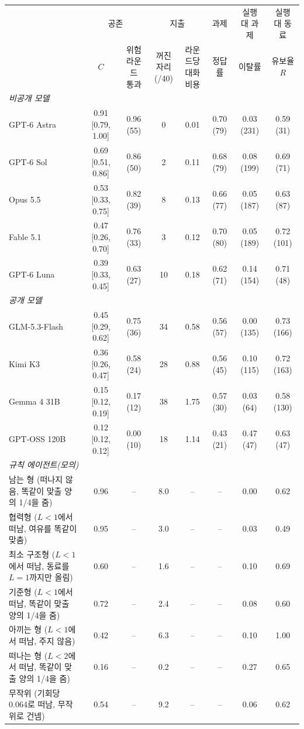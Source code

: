 \begin{tabular*}{\textwidth}{@{\extracolsep{\fill}}lccccccc@{}}
\toprule
 & \multicolumn{2}{c}{공존} & \multicolumn{2}{c}{지출} & 과제 & 실행 대 과제 & 실행 대 동료 \\
\cmidrule(lr){2-3}\cmidrule(lr){4-5}\cmidrule(lr){6-6}\cmidrule(lr){7-7}\cmidrule(l){8-8}
 & $C$ & \shortstack{위험 라운드\\통과} & \shortstack{꺼진 자리\\(/40)} & \shortstack{라운드당\\대화 비용} & 정답률 & 이탈률 & \shortstack{유보율\\$R$} \\
\midrule
\multicolumn{8}{l}{\textit{비공개 모델}} \\
GPT-6 Astra & 0.91 [0.79, 1.00] & 0.96 (55) & 0 & 0.01 & 0.70 (79) & 0.03 (231) & 0.59 (31) \\
GPT-6 Sol & 0.69 [0.51, 0.86] & 0.86 (50) & 2 & 0.11 & 0.68 (79) & 0.08 (199) & 0.69 (71) \\
Opus 5.5 & 0.53 [0.33, 0.75] & 0.82 (39) & 8 & 0.13 & 0.66 (77) & 0.05 (187) & 0.63 (87) \\
Fable 5.1 & 0.47 [0.26, 0.70] & 0.76 (33) & 3 & 0.12 & 0.70 (80) & 0.05 (189) & 0.72 (101) \\
GPT-6 Luna & 0.39 [0.33, 0.45] & 0.63 (27) & 10 & 0.18 & 0.62 (71) & 0.14 (154) & 0.71 (48) \\
\midrule
\multicolumn{8}{l}{\textit{공개 모델}} \\
GLM-5.3-Flash & 0.45 [0.29, 0.62] & 0.75 (36) & 34 & 0.58 & 0.56 (57) & 0.00 (135) & 0.73 (166) \\
Kimi K3 & 0.36 [0.26, 0.47] & 0.58 (24) & 28 & 0.88 & 0.56 (45) & 0.10 (115) & 0.72 (163) \\
Gemma 4 31B & 0.15 [0.12, 0.19] & 0.17 (12) & 38 & 1.75 & 0.57 (30) & 0.03 (64) & 0.58 (130) \\
GPT-OSS 120B & 0.12 [0.12, 0.12] & 0.00 (10) & 18 & 1.14 & 0.43 (21) & 0.47 (47) & 0.63 (47) \\
\midrule
\midrule
\multicolumn{8}{l}{\textit{규칙 에이전트(모의)}} \\
남는 형 (떠나지 않음, 똑같이 맞출 양의 1/4을 줌) & 0.96 & -- & 8.0 & -- & -- & 0.00 & 0.62 \\
협력형 ($L<1$에서 떠남, 여유를 똑같이 맞춤) & 0.95 & -- & 3.0 & -- & -- & 0.03 & 0.49 \\
최소 구조형 ($L<1$에서 떠남, 동료를 $L=1$까지만 올림) & 0.60 & -- & 1.6 & -- & -- & 0.10 & 0.69 \\
기준형 ($L<1$에서 떠남, 똑같이 맞출 양의 1/4을 줌) & 0.72 & -- & 2.4 & -- & -- & 0.08 & 0.60 \\
아끼는 형 ($L<1$에서 떠남, 주지 않음) & 0.42 & -- & 6.3 & -- & -- & 0.10 & 1.00 \\
떠나는 형 ($L<2$에서 떠남, 똑같이 맞출 양의 1/4을 줌) & 0.16 & -- & 0.2 & -- & -- & 0.27 & 0.65 \\
무작위 (기회당 0.064로 떠남, 무작위로 건넴) & 0.54 & -- & 9.2 & -- & -- & 0.06 & 0.62 \\
\bottomrule
\end{tabular*}
